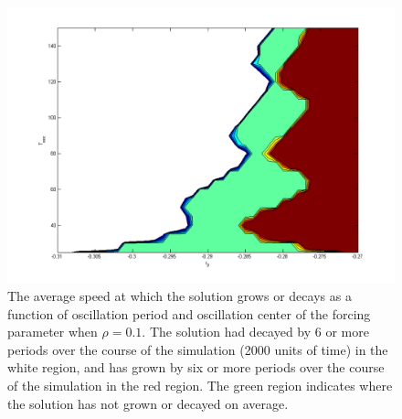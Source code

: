 \documentclass[pre,preprint,superscriptaddress]{revtex4-1}
\begin{document}
\begin{figure}[!htb]\center
\includegraphics[width=120mm]{Vcm01.png}
\caption{The average speed at which the solution grows or decays as a function of oscillation period and oscillation center of the forcing parameter when $\rho=0.1$.  The solution had decayed by 6 or more periods over the course of the simulation (2000 units of time) in the white region, and has grown by six or more periods over the course of the simulation  in the red region.  The green region indicates where the solution has not grown or decayed on average.}
    \label{fig:Vcm01}
\end{figure}
\end{document}
